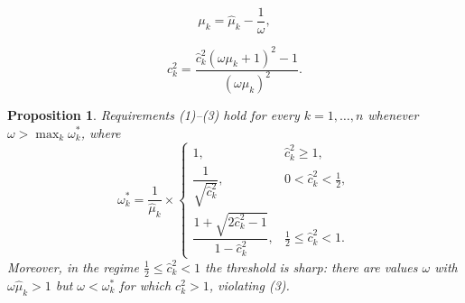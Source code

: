 \documentclass[10pt,a4paper]{amsart}
\newtheorem{proposition}{Proposition}
\begin{document}
\setcounter{section}{7}
\setcounter{equation}{4}
\setcounter{conjecture}{0}
\setcounter{corollary}{1}
\setcounter{definition}{0}
\setcounter{example}{1}
\setcounter{lemma}{3}
\setcounter{proposition}{7}
\setcounter{remark}{0}
\setcounter{theorem}{0}
\begin{equation}
\label{eq:mu_k-correction-omega}
    \mu_{k} = \hat{\mu}_{k} - \frac{1}{\omega},
\end{equation}

\setcounter{section}{7}
\setcounter{equation}{5}
\setcounter{conjecture}{0}
\setcounter{corollary}{1}
\setcounter{definition}{0}
\setcounter{example}{1}
\setcounter{lemma}{3}
\setcounter{proposition}{7}
\setcounter{remark}{0}
\setcounter{theorem}{0}
\begin{equation}
\label{eq:scv_calculated}
    c_{k}^2 = \frac{\hat{c}_{k}^2(\omega \mu_{k}+1)^2-1}{(\omega \mu_{k})^2}.
\end{equation}

\setcounter{section}{7}
\setcounter{equation}{6}
\setcounter{conjecture}{0}
\setcounter{corollary}{1}
\setcounter{definition}{0}
\setcounter{example}{1}
\setcounter{lemma}{3}
\setcounter{proposition}{7}
\setcounter{remark}{0}
\setcounter{theorem}{0}
\begin{proposition}
\label{prop:init-omega}
Requirements (1)--(3) hold for every $k = 1,\ldots,n$ whenever $\omega > \max_{k} \omega^*_k$, where
\begin{equation}
\label{eq:omega-threshold}
\omega^*_k
=
\frac{1}{\hat{\mu}_k}
\times
\begin{cases}
1, & \hat{c}_k^2 \ge 1,\\[1ex]
\dfrac{1}{\sqrt{\hat{c}_k^2}}, & 0 < \hat{c}_k^2 < \tfrac12,\\[2ex]
\dfrac{1+\sqrt{2\hat{c}_k^2-1}}{1-\hat{c}_k^2}, & \tfrac12 \le \hat{c}_k^2 < 1.
\end{cases}
\end{equation}
Moreover, in the regime $\tfrac12 \le \hat{c}_k^2 < 1$ the threshold is sharp: there are values $\omega$ with $\omega\hat{\mu}_k > 1$ but $\omega < \omega^*_k$ for which $c_k^2 > 1$, violating (3).
\end{proposition}
\end{document}
